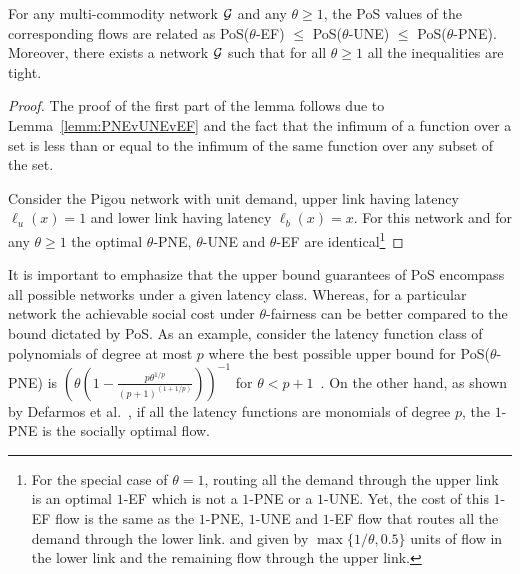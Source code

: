 \begin{lemma}\label{lemm:POSequality}
 For any multi-commodity network $\mathcal{G}$ and any $\theta\geq 1$, the PoS values of the corresponding flows are related as PoS($\theta$-EF) $\leq $  PoS($\theta$-UNE) $\leq $  PoS($\theta$-PNE). Moreover, there exists a network $\mathcal{G}$ such that for all $\theta\geq 1$ all the inequalities are tight.
\end{lemma}
\begin{proof}
The proof of the first part of the lemma follows due to Lemma~\ref{lemm:PNEvUNEvEF} and the fact that the infimum of a function over a set is less than or equal to the infimum of the same function over any subset of the set.

Consider the Pigou network with unit demand,  upper link having latency $\ell_u(x)= 1$ and  lower  link having latency $\ell_b(x) = x$. For this network and for any $\theta\geq 1$ the optimal $\theta$-PNE, $\theta$-UNE and $\theta$-EF are identical\footnote{For the special case of $\theta=1$, routing all the demand through the upper link is an optimal $1$-EF which is not a $1$-PNE or a $1$-UNE. Yet, the cost of this $1$-EF flow is the same as the $1$-PNE, $1$-UNE and $1$-EF flow that routes all the demand through the lower link. and given by $\max\{1/\theta, 0.5\}$ units of flow in the lower link and the remaining flow through the upper link. }
\end{proof}



\begin{remark}
It is important to emphasize that the upper bound guarantees of PoS encompass all possible networks under a given latency class. Whereas, for a particular network the achievable social cost under $\theta$-fairness can be better compared to the bound dictated by PoS. As an example, consider the latency function class of polynomials of degree at most $p$ where the best possible upper bound for PoS($\theta$-PNE) is $\left(\theta\left(1-\frac{p\theta^{1/p}}{(p+1)^{(1+1/p)}}\right)\right)^{-1}$ for $\theta< p+1$~\cite{christodoulou2011performance}. On the other hand, as shown by Defarmos et al.~\cite{dafermos1969traffic}, if all the latency functions are monomials of degree $p$, the $1$-PNE is the socially optimal flow.
\end{remark}
 

